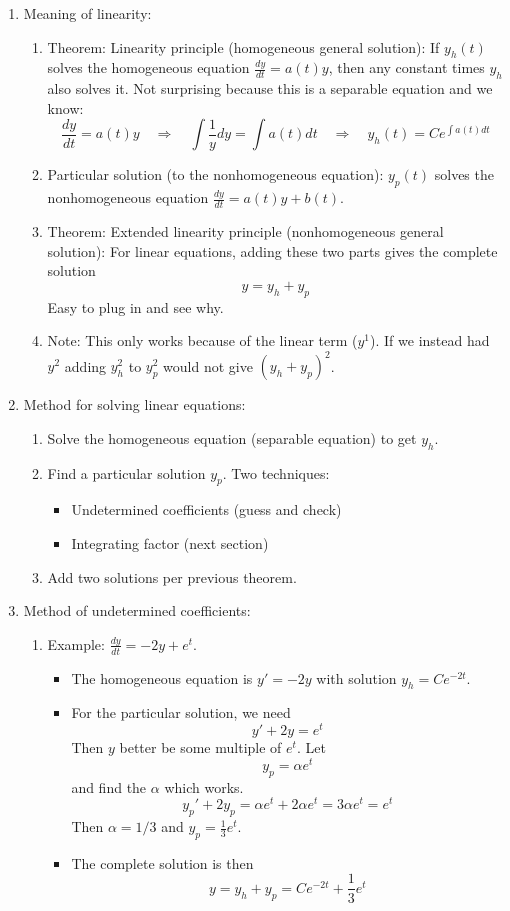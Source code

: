 \documentclass{article}
\newcommand{\ds}{\displaystyle}
\begin{document}
\begin{enumerate}
\item Meaning of linearity:
\begin{enumerate}
\item Theorem: Linearity principle (homogeneous general solution): If $y_h(t)$ solves the homogeneous equation $\frac{dy}{dt} = a(t)y$, then any constant times $y_h$ also solves it. Not surprising because this is a separable equation and we know:
\[
\frac{dy}{dt} = a(t)y \quad \Rightarrow \quad \int \frac{1}{y} dy = \int a(t) dt \quad \Rightarrow \quad y_h(t) = Ce^{\int a(t) dt}
\]
\item Particular solution (to the nonhomogeneous equation): $y_p(t)$ solves the nonhomogeneous equation $\frac{dy}{dt} = a(t)y+b(t)$.
\item Theorem: Extended linearity principle (nonhomogeneous general solution): For linear equations, adding these two parts gives the complete solution
\[
y = y_h + y_p
\]
Easy to plug in and see why.
\item Note: This only works because of the linear term ($y^1$). If we instead had $y^2$ adding $y_h^2$ to $y_p^2$ would not give $(y_h+y_p)^2$.
\end{enumerate}

\item Method for solving linear equations:
\begin{enumerate}
\item Solve the homogeneous equation (separable equation) to get $y_h$.
\item Find a particular solution $y_p$. Two techniques:
\begin{itemize}
\item Undetermined coefficients (guess and check)
\item Integrating factor (next section)
\end{itemize}
\item Add two solutions per previous theorem.
\end{enumerate}

\item Method of undetermined coefficients:
\begin{enumerate}
\item Example: $\ds \frac{dy}{dt} = -2y + e^{t}$. 
\begin{itemize}
\item The homogeneous equation is $y'=-2y$ with solution $y_h = Ce^{-2t}$.
\item For the particular solution, we need
\[
y' +2y = e^{t}
\]
Then $y$ better be some multiple of $e^{t}$. Let
\[
y_p = \alpha e^{t}
\]
and find the $\alpha$ which works.
\[
y_p'+2y_p = \alpha e^{t} +2\alpha e^{t} = 3 \alpha e^{t} = e^{t}
\]
Then $\alpha = 1/3$ and $y_p = \frac{1}{3} e^{t}$.
\item The complete solution is then 
\[
y = y_h + y_p = Ce^{-2t}+\frac{1}{3}e^{t}
\]
\end{itemize}


\end{enumerate}
\end{enumerate}
\end{document}
